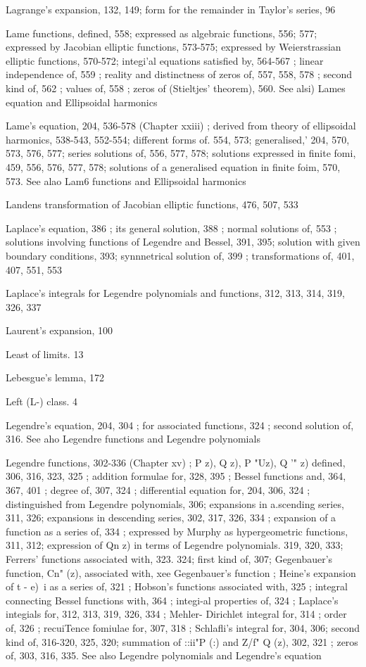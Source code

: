 Lagrange's expansion, 132, 149; form for the remainder in Taylor's series, 96

Lame functions, defined, 558; expressed as algebraic functions, 556; 577; expressed by Jacobian
elliptic functions, 573-575; expressed by Weierstrassian elliptic functions, 570-572; integi'al
equations satisfied by, 564-567 ; linear independence of, 559 ; reality and distinctness of
zeros of, 557, 558, 578 ; second kind of, 562 ; values of, 558 ; zeros of (Stieltjes' theorem),
560. See alsi) Lames equation and Ellipsoidal harmonics

Lame's equation, 204, 536-578 (Chapter xxiii) ; derived from theory of ellipsoidal harmonics,
538-543, 552-554; different forms of. 554, 573; generalised,' 204, 570, 573, 576, 577;
series solutions of, 556, 577, 578; solutions expressed in finite fomi, 459, 556, 576, 577, 578;
solutions of a generalised equation in finite foim, 570, 573. See alao Lam6 functions and
Ellipsoidal harmonics

Landens transformation of Jacobian elliptic functions, 476, 507, 533

Laplace's equation, 386 ; its general solution, 388 ; normal solutions of, 553 ; solutions involving
functions of Legendre and Bessel, 391, 395; solution with given boundary conditions, 393;
synnnetrical solution of, 399 ; transformations of, 401, 407, 551, 553

Laplace's integrals for Legendre polynomials and functions, 312, 313, 314, 319, 326, 337

Laurent's expansion, 100

Least of limits. 13

Lebesgue's lemma, 172

Left (L-) class. 4

Legendre's equation, 204, 304 ; for associated functions, 324 ; second solution of, 316. See aho
Legendre functions and Legendre polynomials

Legendre functions, 302-336 (Chapter xv) ; P  z), Q  z), P "Uz), Q '" z) defined, 306, 316, 323,
325 ; addition formulae for, 328, 395 ; Bessel functions and, 364, 367, 401 ; degree of, 307,
324 ; differential equation for, 204, 306, 324 ; distinguished from Legendre polynomials,
306; expansions in a.scending series, 311, 326; expansions in descending series, 302, 317,
326, 334 ; expansion of a function as a series of, 334 ; expressed by Murphy as hypergeometric
functions, 311, 312; expression of Qn z) in terms of Legendre polynomials. 319, 320, 333;
Ferrers' functions associated with, 323. 324; first kind of, 307; Gegenbauer's function,
Cn" (z), associated with, xee Gegenbauer's function ; Heine's expansion of  t - e)~i as a series
of, 321 ; Hobson's functions associated with, 325 ; integral connecting Bessel functions with,
364 ; integi-al properties of, 324 ; Laplace's integials for, 312, 313, 319, 326, 334 ; Mehler-
Dirichlet integral for, 314 ; order of, 326 ; recuiTence fomiulae for, 307, 318 ; Schlafli's
integral for, 304, 306; second kind of, 316-320, 325, 320; summation of ::ii"P (:) and
Z/f" Q  (z), 302, 321 ; zeros of, 303, 316, 335. See also Legendre polynomials and Legendre's
equation

